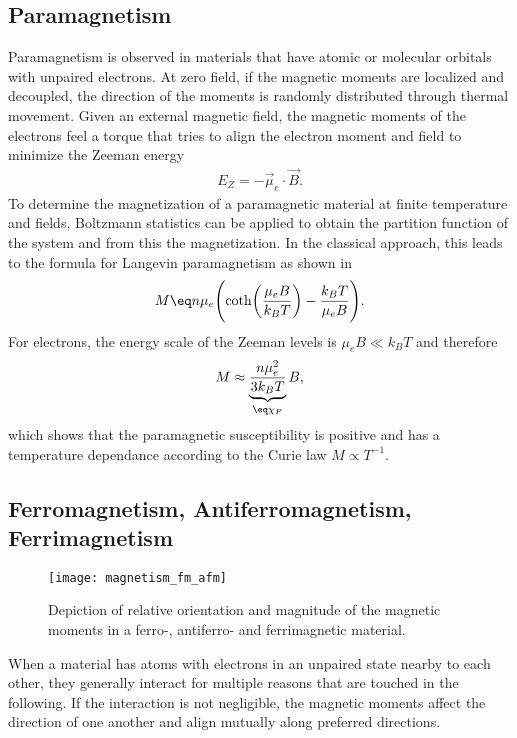 \documentclass[\main/dresen_thesis.tex]{subfiles}
\begin{document}
  \subsection{Paramagnetism}\label{ch:theoreticalBackground:magnetism:paramagnetism}
    Paramagnetism is observed in materials that have atomic or molecular orbitals with unpaired electrons.
    At zero field, if the magnetic moments are localized and decoupled, the direction of the moments is randomly distributed through thermal movement.
    Given an external magnetic field, the magnetic moments of the electrons feel a torque that tries to align the electron moment and field to minimize the Zeeman energy
    \begin{align}
      E_Z = - \vec{\mu}_e \cdot \vec{B}.
    \end{align}
    To determine the magnetization of a paramagnetic material at finite temperature and fields, Boltzmann statistics can be applied to obtain the partition function of the system and from this the magnetization.
    In the classical approach, this leads to the formula for Langevin paramagnetism as shown in 
    \begin{align}
      M \eq n \mu_e \Biggl( \coth \biggl(\frac{\mu_e B}{k_B T} \biggr) - \frac{k_B T}{\mu_e B} \Biggr).
    \end{align}
    For electrons, the energy scale of the Zeeman levels is $\mu_e B \ll k_B T$ and therefore
    \begin{align}
      M \approx \underbrace{\frac{n \mu_e^2}{3k_B T}}_{\eq \chi_P} B,
    \end{align}
    which shows that the paramagnetic susceptibility is positive and has a temperature dependance according to the Curie law $M \propto T^{-1}$.

  \subsection{Ferromagnetism, Antiferromagnetism, Ferrimagnetism}
    \begin{figure}[tb]
      \centering
      \texttt{[image: magnetism\_fm\_afm]}
      \caption{\label{fig:theoreticalBackground:magnetism:fm_afm_fim}Depiction of relative orientation and magnitude of the magnetic moments in a ferro-, antiferro- and ferrimagnetic material.}
    \end{figure}

    When a material has atoms with electrons in an unpaired state nearby to each other, they generally interact for multiple reasons that are touched in the following.
    If the interaction is not negligible, the magnetic moments affect the direction of one another and align mutually along preferred directions.
\end{document}
